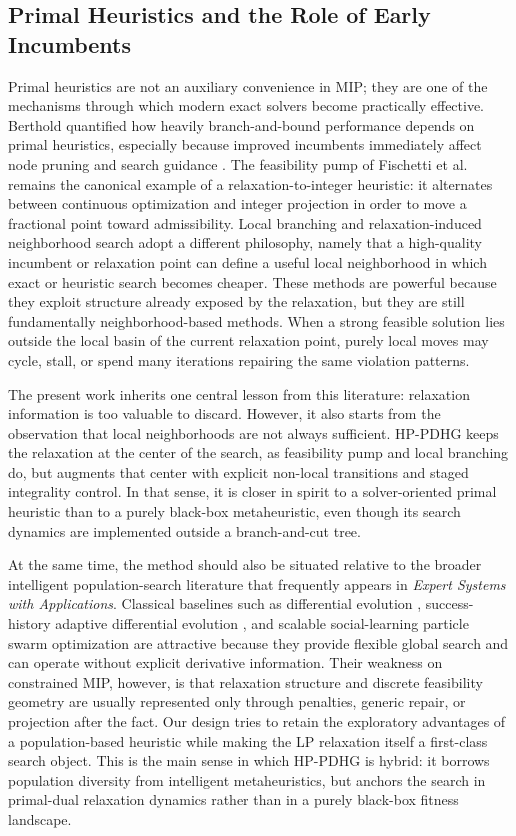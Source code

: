 \subsection{Primal Heuristics and the Role of Early Incumbents}

Primal heuristics are not an auxiliary convenience in MIP; they are one of the mechanisms through which modern exact solvers become practically effective. Berthold quantified how heavily branch-and-bound performance depends on primal heuristics, especially because improved incumbents immediately affect node pruning and search guidance \cite{berthold2013measuring}. The feasibility pump of Fischetti et al.~\cite{fischetti2005feasibility} remains the canonical example of a relaxation-to-integer heuristic: it alternates between continuous optimization and integer projection in order to move a fractional point toward admissibility. Local branching \cite{fischetti2003local} and relaxation-induced neighborhood search \cite{danna2005exploring} adopt a different philosophy, namely that a high-quality incumbent or relaxation point can define a useful local neighborhood in which exact or heuristic search becomes cheaper. These methods are powerful because they exploit structure already exposed by the relaxation, but they are still fundamentally neighborhood-based methods. When a strong feasible solution lies outside the local basin of the current relaxation point, purely local moves may cycle, stall, or spend many iterations repairing the same violation patterns.

The present work inherits one central lesson from this literature: relaxation information is too valuable to discard. However, it also starts from the observation that local neighborhoods are not always sufficient. HP-PDHG keeps the relaxation at the center of the search, as feasibility pump and local branching do, but augments that center with explicit non-local transitions and staged integrality control. In that sense, it is closer in spirit to a solver-oriented primal heuristic than to a purely black-box metaheuristic, even though its search dynamics are implemented outside a branch-and-cut tree.

At the same time, the method should also be situated relative to the broader intelligent population-search literature that frequently appears in \emph{Expert Systems with Applications}. Classical baselines such as differential evolution \cite{storn1997de}, success-history adaptive differential evolution \cite{tanabe2013shade}, and scalable social-learning particle swarm optimization \cite{cheng2015slpso} are attractive because they provide flexible global search and can operate without explicit derivative information. Their weakness on constrained MIP, however, is that relaxation structure and discrete feasibility geometry are usually represented only through penalties, generic repair, or projection after the fact. Our design tries to retain the exploratory advantages of a population-based heuristic while making the LP relaxation itself a first-class search object. This is the main sense in which HP-PDHG is hybrid: it borrows population diversity from intelligent metaheuristics, but anchors the search in primal-dual relaxation dynamics rather than in a purely black-box fitness landscape.

